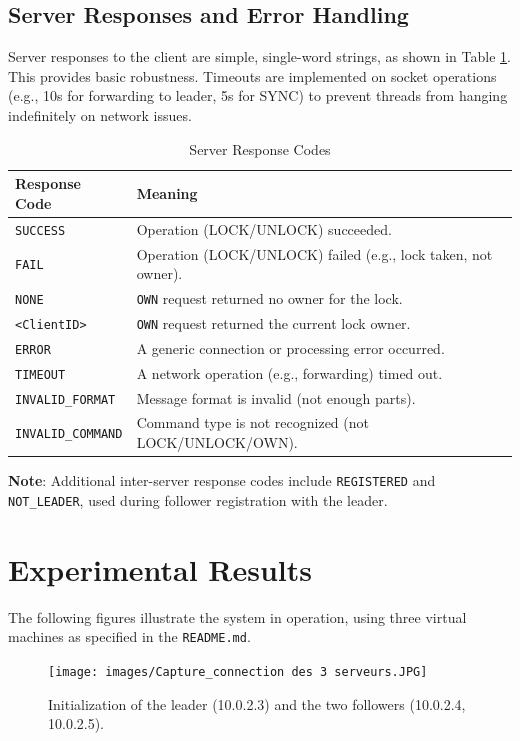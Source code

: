 \documentclass[a4paper,11pt]{article}
\begin{document}
\subsection*{Server Responses and Error Handling}
Server responses to the client are simple, single-word strings, as shown in Table \ref{tab:responses}. This provides basic robustness. Timeouts are implemented on socket operations (e.g., 10s for forwarding to leader, 5s for SYNC) to prevent threads from hanging indefinitely on network issues.

\begin{table}[htbp]
\centering
\caption{Server Response Codes}
\label{tab:responses}
\begin{tabular}{@{}ll@{}}
\toprule
\textbf{Response Code} & \textbf{Meaning} \\
\midrule
\texttt{SUCCESS} & Operation (LOCK/UNLOCK) succeeded. \\
\texttt{FAIL} & Operation (LOCK/UNLOCK) failed (e.g., lock taken, not owner). \\
\texttt{NONE} & \texttt{OWN} request returned no owner for the lock. \\
\texttt{<ClientID>} & \texttt{OWN} request returned the current lock owner. \\
\texttt{ERROR} & A generic connection or processing error occurred. \\
\texttt{TIMEOUT} & A network operation (e.g., forwarding) timed out. \\
\texttt{INVALID\_FORMAT} & Message format is invalid (not enough parts). \\
\texttt{INVALID\_COMMAND} & Command type is not recognized (not LOCK/UNLOCK/OWN). \\
\bottomrule
\end{tabular}
\end{table}

\textbf{Note}: Additional inter-server response codes include \texttt{REGISTERED} and \texttt{NOT\_LEADER}, used during follower registration with the leader.

\section{Experimental Results}
The following figures illustrate the system in operation, using three virtual machines as specified in the \texttt{README.md}.

\begin{figure}[H]
\centering
\texttt{[image: images/Capture\_connection des 3 serveurs.JPG]}
\caption{Initialization of the leader (10.0.2.3) and the two followers (10.0.2.4, 10.0.2.5).}
\end{figure}
\end{document}
